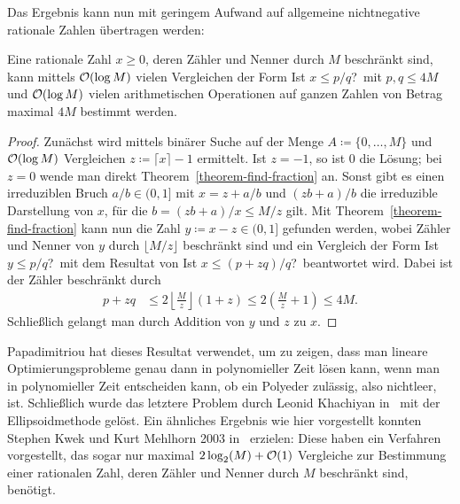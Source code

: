 Das Ergebnis kann nun mit geringem Aufwand auf allgemeine nichtnegative rationale Zahlen übertragen werden:

\begin{theorem}\label{theorem-find-rational}
	Eine rationale Zahl $x\geq0$, deren Zähler und Nenner durch $M$ beschränkt sind, kann mittels $\mathcal{O}(\log M)$ vielen Vergleichen der Form \glqq Ist $x\leq p/q$?\grqq\ mit $p,q\leq 4M$ und $\mathcal{O}(\log M)$ vielen arithmetischen Operationen auf ganzen Zahlen von Betrag maximal $4M$ bestimmt werden.
\end{theorem}
\begin{proof}
	\newcommand{\highx}{\lceil x \rceil}
	Zunächst wird mittels binärer Suche auf der Menge $A\coloneq \{0,\dots, M\}$ und $\mathcal{O}(\log M)$ Vergleichen $z\coloneq \highx - 1$ ermittelt.
	Ist $z=-1$, so ist $0$ die Lösung; bei $z=0$ wende man direkt Theorem~\ref{theorem-find-fraction} an.
	Sonst gibt es einen irreduziblen Bruch $a/b\in(0,1]$ mit $x=z + a/b$ und $(z b + a)/b$ die irreduzible Darstellung von $x$, für die $b = (z b + a)/x \leq M/z$ gilt.
	Mit Theorem~\ref{theorem-find-fraction} kann nun die Zahl $y\coloneq x-z\in(0,1]$ gefunden werden, wobei Zähler und Nenner von $y$ durch $\lfloor M/z \rfloor$ beschränkt sind und ein Vergleich der Form \glqq Ist $y\leq p/q$?\grqq\ mit dem Resultat von \glqq Ist $x\leq (p + zq)/q$?\grqq\ beantwortet wird.
	Dabei ist der Zähler beschränkt durch \begin{align*}
	p+z q &\leq 2 \left\lfloor \frac{M}{z} \right\rfloor (1+z) \leq 2 \left(\frac{M}{z} + 1\right)\leq 4M.
	\end{align*}
	Schließlich gelangt man durch Addition von $y$ und $z$ zu $x$.
\end{proof}

Papadimitriou hat dieses Resultat verwendet, um zu zeigen, dass man lineare Optimierungsprobleme genau dann in polynomieller Zeit lösen kann, wenn man in polynomieller Zeit entscheiden kann, ob ein Polyeder zulässig, also nichtleer, ist.
Schließlich wurde das letztere Problem durch Leonid Khachiyan in~\cite{Kha79} mit der Ellipsoidmethode gelöst.
Ein ähnliches Ergebnis wie hier vorgestellt konnten Stephen Kwek und Kurt Mehlhorn 2003 in~\cite{Kwek:2003} erzielen:
Diese haben ein Verfahren vorgestellt, das sogar nur maximal $2\log_2(M) + \mathcal{O}(1)$ Vergleiche zur Bestimmung einer rationalen Zahl, deren Zähler und Nenner durch $M$ beschränkt sind, benötigt.